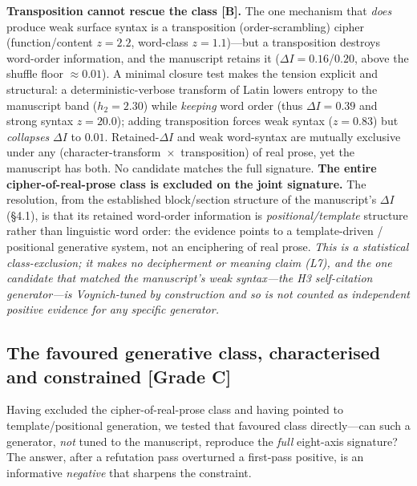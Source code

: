 \documentclass[11pt]{article}
\newcommand{\grade}[1]{{\small\textbf{[#1]}}}
\begin{document}
\textbf{Transposition cannot rescue the class \grade{B}.} The one mechanism that
\emph{does} produce weak surface syntax is a transposition (order-scrambling) cipher
(function/content $z=2.2$, word-class $z=1.1$)---but a transposition destroys word-order
information, and the manuscript retains it ($\Delta I=0.16$/$0.20$, above the shuffle
floor $\approx0.01$). A minimal closure test makes the tension explicit and structural:
a deterministic-verbose transform of Latin lowers entropy to the manuscript band
($h_2=2.30$) while \emph{keeping} word order (thus $\Delta I=0.39$ and strong syntax
$z=20.0$); adding transposition forces weak syntax ($z=0.83$) but \emph{collapses}
$\Delta I$ to $0.01$. Retained-$\Delta I$ and weak word-syntax are mutually exclusive
under any (character-transform~$\times$~transposition) of real prose, yet the manuscript
has both. No candidate matches the full signature. \textbf{The entire
cipher-of-real-prose class is excluded on the joint signature.} The resolution, from the
established block/section structure of the manuscript's $\Delta I$ (\S4.1), is that its
retained word-order information is \emph{positional/template} structure rather than
linguistic word order: the evidence points to a template-driven / positional generative
system, not an enciphering of real prose. \emph{This is a statistical class-exclusion;
it makes no decipherment or meaning claim (L7), and the one candidate that matched the
manuscript's weak syntax---the H3 self-citation generator---is Voynich-tuned by
construction and so is not counted as independent positive evidence for any specific
generator.}

\subsection{The favoured generative class, characterised and constrained \grade{Grade C}}
Having excluded the cipher-of-real-prose class and having pointed to template/positional
generation, we tested that favoured class directly---can such a generator, \emph{not}
tuned to the manuscript, reproduce the \emph{full} eight-axis signature? The answer,
after a refutation pass overturned a first-pass positive, is an informative
\emph{negative} that sharpens the constraint.
\end{document}
